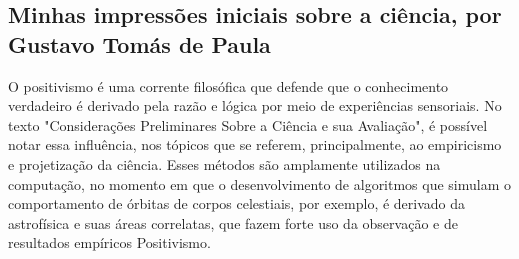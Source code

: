 \subsection{Minhas impressões iniciais sobre a ciência, por Gustavo Tomás de Paula}

O positivismo \citep{wikipedia_positivismo_2022} é uma corrente filosófica que defende que o conhecimento verdadeiro é derivado pela razão e lógica por meio de experiências sensoriais. No texto "Considerações Preliminares Sobre a Ciência e sua Avaliação", é possível notar essa influência, nos tópicos que se referem, principalmente, ao empiricismo e projetização da ciência. Esses métodos são amplamente utilizados na computação, no momento em que o desenvolvimento de algoritmos que simulam o comportamento de órbitas de corpos celestiais, por exemplo, é derivado da astrofísica e suas áreas correlatas, que fazem forte uso da observação e de resultados empíricos \gls{Positivismo}.
